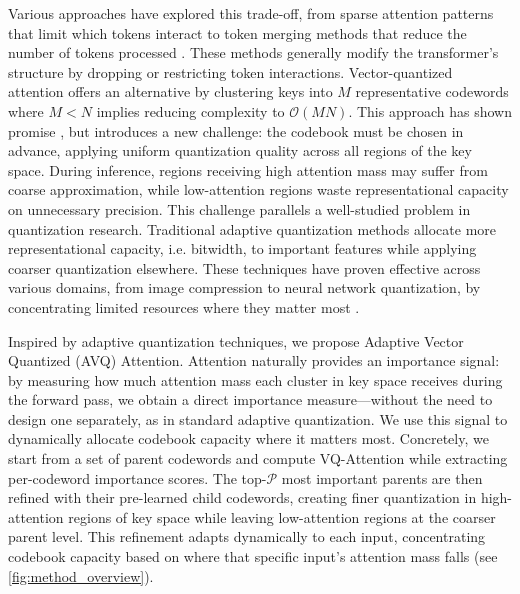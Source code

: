 Various approaches have explored this trade-off, from sparse attention patterns that limit which tokens interact \cite{beltagy2020longformerlongdocumenttransformer,child2019generatinglongsequencessparse,roy2021efficient} to token merging methods that reduce the number of tokens processed \cite{bolya2022tokenmerging}. These methods generally modify the transformer's structure by dropping or restricting token interactions.
Vector-quantized attention offers an alternative by clustering keys into $M$ representative codewords where $M<N$ implies reducing complexity to $\mathcal{O}(MN)$. This approach has shown promise \cite{lingletransformer}, but introduces a new challenge: the codebook must be chosen in advance, applying uniform quantization quality across all regions of the key space. During inference, regions receiving high attention mass may suffer from coarse approximation, while low-attention regions waste representational capacity on unnecessary precision. This challenge parallels a well-studied problem in quantization research. Traditional adaptive quantization methods allocate more representational capacity, i.e. bitwidth, to important features while applying coarser quantization elsewhere. These techniques have proven effective across various domains, from image compression to neural network quantization, by concentrating limited resources where they matter most \cite{wallace1991jpeg,wang2019haq,vandendool2025adaptivemesh}.

Inspired by adaptive quantization techniques, we propose Adaptive Vector Quantized (AVQ) Attention. Attention naturally provides an importance signal: by measuring how much attention mass each cluster in key space receives during the forward pass, we obtain a direct importance measure—without the need to design one separately, as in standard adaptive quantization. We use this signal to dynamically allocate codebook capacity where it matters most. Concretely, we start from a set of parent codewords and compute VQ-Attention while extracting per-codeword importance scores. The top-$\mathcal{P}$ most important parents are then refined with their pre-learned child codewords, creating finer quantization in high-attention regions of key space while leaving low-attention regions at the coarser parent level. This refinement adapts dynamically to each input, concentrating codebook capacity based on where that specific input's attention mass falls (see \cref{fig:method_overview}).

